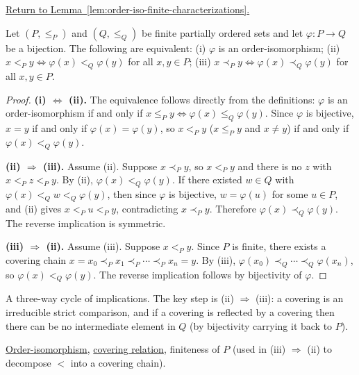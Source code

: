 
\newpage
{}
\label{prf:order-iso-finite-characterizations}

\begin{remark*}[Return]
\hyperref[lem:order-iso-finite-characterizations]{Return to Lemma~\ref*{lem:order-iso-finite-characterizations}.}
\end{remark*}

\begin{theorem*}
Let $(P, \leq_P)$ and $(Q, \leq_Q)$ be finite partially ordered sets and
let $\varphi : P \to Q$ be a bijection.  The following are equivalent:
(i) $\varphi$ is an order-isomorphism;
(ii) $x <_P y \Leftrightarrow \varphi(x) <_Q \varphi(y)$ for all $x,y \in P$;
(iii) $x \prec_P y \Leftrightarrow \varphi(x) \prec_Q \varphi(y)$ for all $x,y \in P$.
\end{theorem*}

\begin{proof}[Proof]
\textbf{(i) $\Leftrightarrow$ (ii).}
The equivalence follows directly from the definitions: $\varphi$ is an
order-isomorphism if and only if $x \leq_P y \Leftrightarrow \varphi(x)
\leq_Q \varphi(y)$.  Since $\varphi$ is bijective, $x = y$ if and only if
$\varphi(x) = \varphi(y)$, so $x <_P y$ ($x \leq_P y$ and $x \neq y$)
if and only if $\varphi(x) <_Q \varphi(y)$.

\textbf{(ii) $\Rightarrow$ (iii).}
Assume (ii).  Suppose $x \prec_P y$, so $x <_P y$ and there is no $z$
with $x <_P z <_P y$.  By (ii), $\varphi(x) <_Q \varphi(y)$.  If there
existed $w \in Q$ with $\varphi(x) <_Q w <_Q \varphi(y)$, then since
$\varphi$ is bijective, $w = \varphi(u)$ for some $u \in P$, and (ii)
gives $x <_P u <_P y$, contradicting $x \prec_P y$.  Therefore
$\varphi(x) \prec_Q \varphi(y)$.  The reverse implication is symmetric.

\textbf{(iii) $\Rightarrow$ (ii).}
Assume (iii).  Suppose $x <_P y$.  Since $P$ is finite, there exists a
covering chain $x = x_0 \prec_P x_1 \prec_P \cdots \prec_P x_n = y$.
By (iii), $\varphi(x_0) \prec_Q \cdots \prec_Q \varphi(x_n)$, so
$\varphi(x) <_Q \varphi(y)$.  The reverse implication follows by
bijectivity of $\varphi$.
\end{proof}

\begin{remark*}
A three-way cycle of implications.  The key step is (ii) $\Rightarrow$
(iii): a covering is an irreducible strict comparison, and if a
covering is reflected by a covering then there can be no intermediate
element in $Q$ (by bijectivity carrying it back to $P$).
\end{remark*}

\begin{remark*}[Dependencies]
\hyperref[def:order-isomorphism]{Order-isomorphism},
\hyperref[def:covering-relation]{covering relation},
finiteness of $P$ (used in (iii) $\Rightarrow$ (ii) to decompose $<$ into a covering chain).
\end{remark*}

